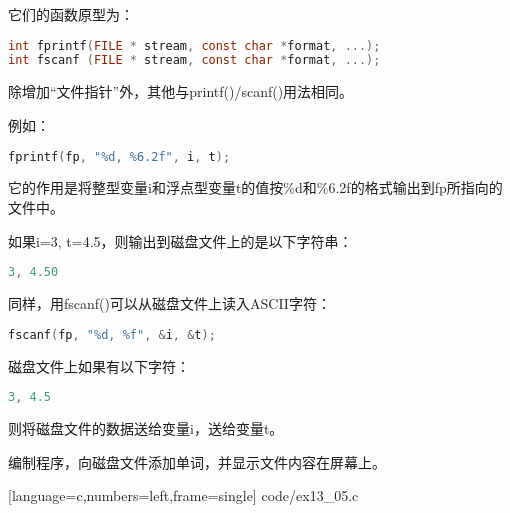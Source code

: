 \begin{frame}[fragile]
  它们的函数原型为：
  \begin{lstlisting}[language=c,backgroundcolor=\color{red!20}]
int fprintf(FILE * stream, const char *format, ...);
int fscanf (FILE * stream, const char *format, ...);
  \end{lstlisting}
  除增加“文件指针”外，其他与{\tf printf()/scanf()}用法相同。
\end{frame}

\begin{frame}[fragile]
  例如：
  \begin{lstlisting}[language=c,backgroundcolor=\color{red!20}]
fprintf(fp, "%d, %6.2f", i, t);
  \end{lstlisting}
  它的作用是将整型变量{\tf i}和浮点型变量{\tf t}的值按{\tf \%d}和{\tf \%6.2f}的格式输出到{\tf fp}所指向的文件中。 \vspace{0.1in}


  如果{\tf i=3, t=4.5}，则输出到磁盘文件上的是以下字符串：
  \begin{lstlisting}[language=c,backgroundcolor=\color{red!20}]
3, 4.50
  \end{lstlisting}

\end{frame}

\begin{frame}[fragile]
  同样，用{\tf fscanf()}可以从磁盘文件上读入{\tf ASCII}字符：
  \begin{lstlisting}[language=c,backgroundcolor=\color{red!20}]
fscanf(fp, "%d, %f", &i, &t);
  \end{lstlisting}
  磁盘文件上如果有以下字符：
  \begin{lstlisting}[language=c,backgroundcolor=\color{red!20}]
3, 4.5
  \end{lstlisting}
  则将磁盘文件的数据{}送给变量{\tf i}，{}送给变量{\tf t}。
\end{frame}

\begin{frame}[fragile]
  \begin{li}
    编制程序，向磁盘文件添加单词，并显示文件内容在屏幕上。
  \end{li}
\end{frame}


\begin{frame}
  
  [language=c,numbers=left,frame=single]
  {code/ex13_05.c}
\end{frame}


